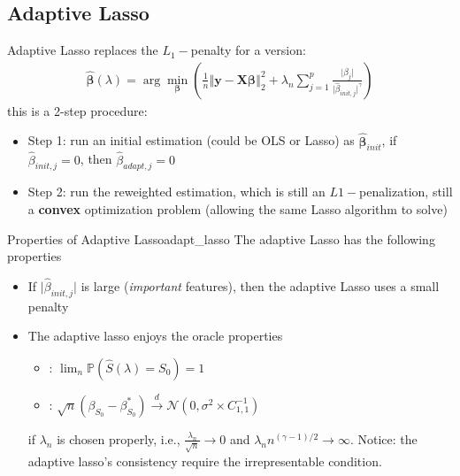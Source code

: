 \documentclass[twoside]{article}
\begin{document}
\subsection{Adaptive Lasso}
Adaptive Lasso replaces the $L_1-$penalty for a  version:
\begin{align*}
    \hat{\boldsymbol{\beta}}(\lambda) = \arg\min_{\boldsymbol{\beta}} \left( \frac{1}{n} \left\Vert \mathbf{y}-\mathbf{X}\boldsymbol{\beta} \right\Vert ^2_2 + \lambda_n \sum^p_{j=1}\frac{\lvert \beta_j \rvert}{ \lvert \hat{\beta}_{init,j} \rvert^{\gamma} } \right)
\end{align*}
this is a 2-step procedure:
\begin{itemize}
    \item Step 1: run an initial estimation (could be OLS or Lasso) as $\hat{\boldsymbol{\beta}}_{init}$, if $\hat{\beta}_{init,j}=0$, then $\hat{\beta}_{adapt,j}=0$
    \item Step 2: run the reweighted estimation, which is still an $L1-$penalization, still a \textbf{convex} optimization problem (allowing the same Lasso algorithm to solve)
\end{itemize}
\begin{theorem}{Properties of Adaptive Lasso}{adapt_lasso}
    The adaptive Lasso has the following properties
    \begin{itemize}
        \item If $\lvert \hat{\beta}_{init,j} \rvert$ is large (\textit{important} features), then the adaptive Lasso uses a small penalty
        \item The adaptive lasso enjoys the oracle properties 
        \begin{itemize}
            \item {}: $\lim_n \mathbb{P}\left(\hat{S}(\lambda)=S_0\right)=1$
            \item {}: $\sqrt{n}\left(\beta_{S_0}-\beta^*_{S_0}\right) \xrightarrow{d} \mathcal{N}(0,\sigma^2\times C^{-1}_{1,1}) $
        \end{itemize}
        if $\lambda_n$ is chosen properly, i.e., $\frac{\lambda_n}{\sqrt{n}}\rightarrow 0$ and $\lambda_n n^{(\gamma-1)/2}\rightarrow \infty$. Notice: the adaptive lasso's consistency  require the irrepresentable condition.
    \end{itemize}

\end{theorem}
\end{document}
